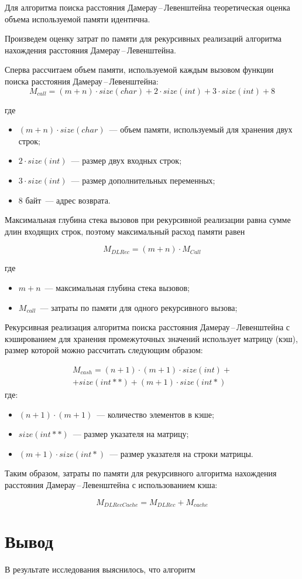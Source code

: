 Для алгоритма поиска расстояния Дамерау\,--\,Левенштейна теорети\-ческая оценка объема используемой памяти идентична.

Произведем оценку затрат по памяти для рекурсивных реализаций алгоритма нахождения расстояния Дамерау\,--\,Левенштейна.

Сперва рассчитаем объем памяти, используемой каждым вызовом функции поиска расстояния Дамерау\,--\,Левенштейна:
\begin{equation}
    M_{call} = (m + n) \cdot size(char) + 2 \cdot size(int) + 3 \cdot size(int) + 8
\end{equation}

\noindent где
\begin{itemize}
    \item $(m + n) \cdot size(char)$~--- объем памяти, используемый для хранения двух строк;
    \item $2 \cdot size(int)$~--- размер двух входных строк;
    \item $3 \cdot size(int)$~--- размер дополнительных переменных;
    \item 8 байт~--- адрес возврата.
\end{itemize}

Максимальная глубина стека вызовов при рекурсивной реализации равна сумме длин входящих строк, поэтому максимальный расход памяти равен

\begin{equation}
    M_{DLRec} = (m + n) \cdot M_{Call}
\end{equation}

\noindent где

\begin{itemize}
    \item $m + n$~--- максимальная глубина стека вызовов;
    \item $M_{call}$~--- затраты по памяти для одного рекурсивного вызова;
\end{itemize}

Рекурсивная реализация алгоритма поиска расстояния Дамерау\,--\,Левенштейна с кэшированием для хранения промежуточных значений использует матрицу (кэш), размер которой можно рассчитать следующим образом:

\begin{multline}
	M_{cash} = (n + 1) \cdot (m + 1) \cdot size(int) +\\+ size(int **) + (m + 1) \cdot size(int *)
\end{multline}
где: 
\begin{itemize}
    \item $(n + 1) \cdot (m + 1)$~--- количество элементов в кэше;
	\item $size(int **)$~--- размер указателя на матрицу;
	\item $(m + 1) \cdot size(int *)$~--- размер указателя на строки матрицы.
\end{itemize}

Таким образом, затраты по памяти для рекурсивного алгоритма нахождения расстояния Дамерау\,--\,Левенштейна с использованием кэша:

\begin{equation}
    M_{DLRecCache} = M_{DLRec} + M_{cache}
\end{equation}

\section{Вывод}

В результате исследования выяснилось, что алгоритм 
